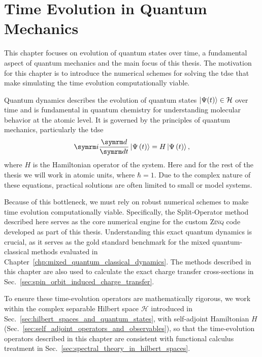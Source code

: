 \chapter{Time Evolution in Quantum Mechanics}\label{chp:time_evolution}
This chapter focuses on evolution of quantum states over time, a fundamental aspect of quantum mechanics and the main focus of this thesis. The motivation for this chapter is to introduce the numerical schemes for solving the \gls{tdse} that make simulating the time evolution computationally viable.

Quantum dynamics describes the evolution of quantum states $\ket{\Psi(t)}\in\mathcal{H}$ over time and is fundamental in quantum chemistry for understanding molecular behavior at the atomic level. It is governed by the principles of quantum mechanics, particularly the \gls{tdse}
\begin{equation}\label{eq:tdse}
\i\ddt\ket{\Psi\left(t\right)}=H\ket{\Psi\left(t\right)},
\end{equation}
where $H$ is the Hamiltonian operator of the system. Here and for the rest of the thesis we will work in atomic units, where $\hbar=1$. Due to the complex nature of these equations, practical solutions are often limited to small or model systems.

Because of this bottleneck, we must rely on robust numerical schemes to make time evolution computationally viable. Specifically, the Split-Operator method described here serves as the core numerical engine for the custom \textsc{Zinq} code developed as part of this thesis.\supercite{10.5281/zenodo.18386143} Understanding this exact quantum dynamics is crucial, as it serves as the gold standard benchmark for the mixed quantum-classical methods evaluated in Chapter~\ref{chp:mixed_quantum_classical_dynamics}. The methods described in this chapter are also used to calculate the exact charge transfer cross-sections in Sec.~\ref{sec:spin_orbit_induced_charge_transfer}.

To ensure these time-evolution operators are mathematically rigorous, we work within the complex separable Hilbert space $\mathcal{H}$ introduced in Sec.~\ref{sec:hilbert_spaces_and_quantum_states}, with self-adjoint Hamiltonian $H$ (Sec.~\ref{sec:self_adjoint_operators_and_observables}), so that the time-evolution operators described in this chapter are consistent with functional calculus treatment in Sec.~\ref{sec:spectral_theory_in_hilbert_spaces}.



